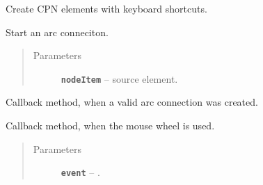 \documentclass[a4paper,10pt,english]{sphinxmanual}
\begin{document}
\begin{fulllineitems}
\begin{fulllineitems}
\end{fulllineitems}


\begin{fulllineitems}
\label{gui_link:gui.DiagramEditor.DiagramEditor.shortcutCreateNode}
Create CPN elements with keyboard shortcuts.

\end{fulllineitems}


\begin{fulllineitems}
\label{gui_link:gui.DiagramEditor.DiagramEditor.startArc}
Start an arc conneciton.
\begin{quote}\begin{description}
\item[{Parameters}] \leavevmode
\textbf{\texttt{nodeItem}} --  source element.

\end{description}\end{quote}

\end{fulllineitems}


\begin{fulllineitems}
\label{gui_link:gui.DiagramEditor.DiagramEditor.validConnection}
Callback method, when a valid arc connection was created.

\end{fulllineitems}


\begin{fulllineitems}
\label{gui_link:gui.DiagramEditor.DiagramEditor.wheelEvent}
Callback method, when the mouse wheel is used.
\begin{quote}\begin{description}
\item[{Parameters}] \leavevmode
\textbf{\texttt{event}} -- .

\end{description}\end{quote}

\end{fulllineitems}


\end{fulllineitems}
\end{document}
